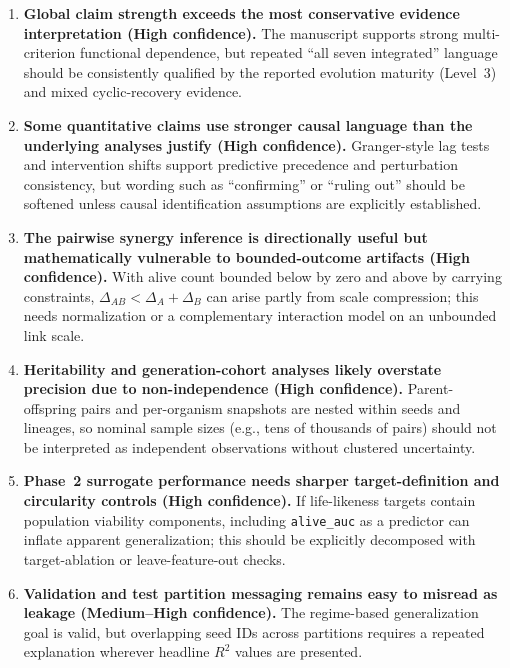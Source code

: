 \documentclass[11pt]{article}
\begin{document}
\begin{enumerate}
  \item \textbf{Global claim strength exceeds the most conservative evidence interpretation (High confidence).} The manuscript supports strong multi-criterion functional dependence, but repeated ``all seven integrated'' language should be consistently qualified by the reported evolution maturity (Level~3) and mixed cyclic-recovery evidence.

  \item \textbf{Some quantitative claims use stronger causal language than the underlying analyses justify (High confidence).} Granger-style lag tests and intervention shifts support predictive precedence and perturbation consistency, but wording such as ``confirming'' or ``ruling out'' should be softened unless causal identification assumptions are explicitly established.

  \item \textbf{The pairwise synergy inference is directionally useful but mathematically vulnerable to bounded-outcome artifacts (High confidence).} With alive count bounded below by zero and above by carrying constraints, $\Delta_{AB} < \Delta_A + \Delta_B$ can arise partly from scale compression; this needs normalization or a complementary interaction model on an unbounded link scale.

  \item \textbf{Heritability and generation-cohort analyses likely overstate precision due to non-independence (High confidence).} Parent-offspring pairs and per-organism snapshots are nested within seeds and lineages, so nominal sample sizes (e.g., tens of thousands of pairs) should not be interpreted as independent observations without clustered uncertainty.

  \item \textbf{Phase~2 surrogate performance needs sharper target-definition and circularity controls (High confidence).} If life-likeness targets contain population viability components, including \texttt{alive\_auc} as a predictor can inflate apparent generalization; this should be explicitly decomposed with target-ablation or leave-feature-out checks.

  \item \textbf{Validation and test partition messaging remains easy to misread as leakage (Medium--High confidence).} The regime-based generalization goal is valid, but overlapping seed IDs across partitions requires a repeated explanation wherever headline $R^2$ values are presented.


\end{enumerate}
\end{document}
